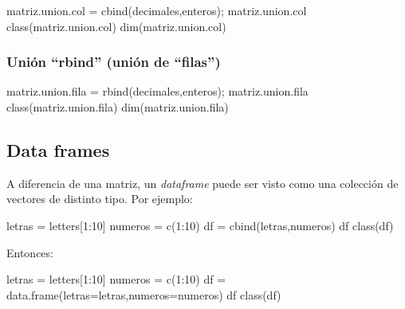 \documentclass[
  spanish,
  letterpaper,
  DIV=11,
  numbers=noendperiod]{scrreprt}
\newenvironment{Shaded}{\begin{snugshade}}{\end{snugshade}}
\newcommand{\AttributeTok}[1]{\textcolor[rgb]{0.40,0.45,0.13}{#1}}
\newcommand{\DecValTok}[1]{\textcolor[rgb]{0.68,0.00,0.00}{#1}}
\newcommand{\FunctionTok}[1]{\textcolor[rgb]{0.28,0.35,0.67}{#1}}
\newcommand{\NormalTok}[1]{\textcolor[rgb]{0.00,0.23,0.31}{#1}}
\newcommand{\OtherTok}[1]{\textcolor[rgb]{0.00,0.23,0.31}{#1}}
\newcommand{\SpecialCharTok}[1]{\textcolor[rgb]{0.37,0.37,0.37}{#1}}
\begin{document}
\begin{Shaded}
\begin{Highlighting}[]

\NormalTok{matriz.union.col }\OtherTok{=} \FunctionTok{cbind}\NormalTok{(decimales,enteros); matriz.union.col}
\FunctionTok{class}\NormalTok{(matriz.union.col)}
\FunctionTok{dim}\NormalTok{(matriz.union.col)}
\end{Highlighting}
\end{Shaded}

\subsubsection{Unión ``rbind'' (unión de
``filas'')}\label{uniuxf3n-rbind-uniuxf3n-de-filas}

\begin{Shaded}
\begin{Highlighting}[]

\NormalTok{matriz.union.fila }\OtherTok{=} \FunctionTok{rbind}\NormalTok{(decimales,enteros); matriz.union.fila}
\FunctionTok{class}\NormalTok{(matriz.union.fila)}
\FunctionTok{dim}\NormalTok{(matriz.union.fila)}
\end{Highlighting}
\end{Shaded}

\subsection{Data frames}\label{data-frames}

A diferencia de una matriz, un \emph{dataframe} puede ser visto como una
colección de vectores de distinto tipo. Por ejemplo:

\begin{Shaded}
\begin{Highlighting}[]
\NormalTok{letras }\OtherTok{=}\NormalTok{ letters[}\DecValTok{1}\SpecialCharTok{:}\DecValTok{10}\NormalTok{]}
\NormalTok{numeros }\OtherTok{=} \FunctionTok{c}\NormalTok{(}\DecValTok{1}\SpecialCharTok{:}\DecValTok{10}\NormalTok{)}
\NormalTok{df }\OtherTok{=} \FunctionTok{cbind}\NormalTok{(letras,numeros)}
\NormalTok{df}
\FunctionTok{class}\NormalTok{(df)}
\end{Highlighting}
\end{Shaded}

Entonces:

\begin{Shaded}
\begin{Highlighting}[]
\NormalTok{letras }\OtherTok{=}\NormalTok{ letters[}\DecValTok{1}\SpecialCharTok{:}\DecValTok{10}\NormalTok{]}
\NormalTok{numeros }\OtherTok{=} \FunctionTok{c}\NormalTok{(}\DecValTok{1}\SpecialCharTok{:}\DecValTok{10}\NormalTok{)}
\NormalTok{df }\OtherTok{=} \FunctionTok{data.frame}\NormalTok{(}\AttributeTok{letras=}\NormalTok{letras,}\AttributeTok{numeros=}\NormalTok{numeros)}
\NormalTok{df}
\FunctionTok{class}\NormalTok{(df)}
\end{Highlighting}
\end{Shaded}
\end{document}

